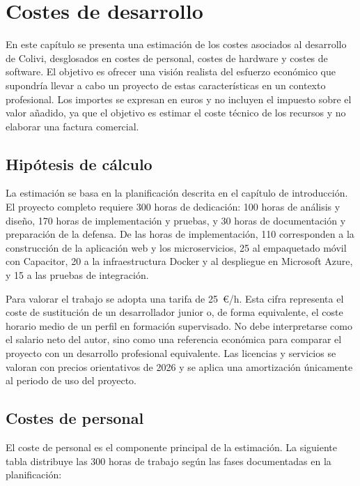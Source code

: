 \chapter{Costes de desarrollo}
\label{chap:costes_desarrollo}

En este capítulo se presenta una estimación de los costes asociados al desarrollo de Colivi, desglosados en costes de personal, costes de hardware y costes de software. El objetivo es ofrecer una visión realista del esfuerzo económico que supondría llevar a cabo un proyecto de estas características en un contexto profesional. Los importes se expresan en euros y no incluyen el impuesto sobre el valor añadido, ya que el objetivo es estimar el coste técnico de los recursos y no elaborar una factura comercial.

\section{Hipótesis de cálculo}
\label{sec:hipotesis_costes}

La estimación se basa en la planificación descrita en el capítulo de introducción. El proyecto completo requiere 300 horas de dedicación: 100 horas de análisis y diseño, 170 horas de implementación y pruebas, y 30 horas de documentación y preparación de la defensa. De las horas de implementación, 110 corresponden a la construcción de la aplicación web y los microservicios, 25 al empaquetado móvil con Capacitor, 20 a la infraestructura Docker y al despliegue en Microsoft Azure, y 15 a las pruebas de integración.

Para valorar el trabajo se adopta una tarifa de 25~\euro/\hspace{0.05em}h. Esta cifra representa el coste de sustitución de un desarrollador junior o, de forma equivalente, el coste horario medio de un perfil en formación supervisado. No debe interpretarse como el salario neto del autor, sino como una referencia económica para comparar el proyecto con un desarrollo profesional equivalente. Las licencias y servicios se valoran con precios orientativos de 2026 y se aplica una amortización únicamente al periodo de uso del proyecto.

\section{Costes de personal}
\label{sec:costes_personal}

El coste de personal es el componente principal de la estimación. La siguiente tabla distribuye las 300 horas de trabajo según las fases documentadas en la planificación:

